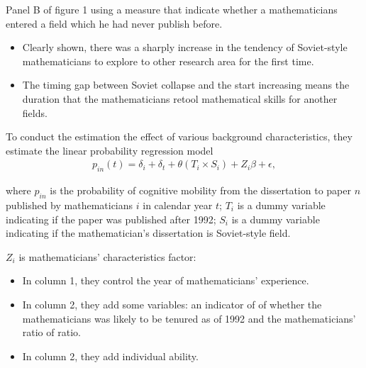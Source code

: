 \documentclass[../root]{subfiles}
\begin{document}
    Panel B of figure 1 using a measure that indicate whether a mathematicians entered a field which he had never publish before.
    
    \begin{itemize}
        \item Clearly shown, there was a sharply increase in the tendency of Soviet-style mathematicians to explore to other research area for the first time.
        \item The timing gap between Soviet collapse and the start increasing means the duration that the mathematicians retool mathematical skills for another fields.
    \end{itemize}
    To conduct the estimation the effect of various background characteristics, they estimate the linear probability regression model 
    \begin{align}
        p_{in}(t) = \delta_i + \delta_t + \theta (T_i \times S_i) +Z_i \beta +\epsilon,
    \end{align}
    
    where $p_{in}$ is the probability of cognitive mobility from the dissertation to paper $n$ published by mathematicians $i$ in calendar year $t$; $T_i$ is a dummy variable indicating if the paper was published after 1992; $S_i$ is a dummy variable indicating if the mathematician's dissertation is Soviet-style field.  
    
    $Z_i$ is mathematicians' characteristics factor:
    \begin{itemize}
        \item In column 1, they control the year of mathematicians' experience.
        \item In column 2, they add some variables: an indicator of of whether the mathematicians was likely to be tenured as of 1992 and the mathematicians' ratio of ratio.
        \item In column 2, they add individual ability.
    \end{itemize}
    
\end{document}

